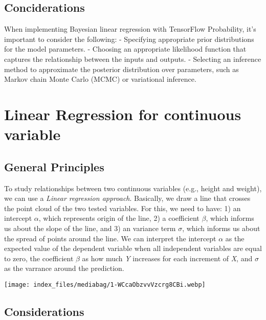 \documentclass[
  letterpaper,
  DIV=11,
  numbers=noendperiod]{scrreprt}
\begin{document}
\section{Conciderations}\label{conciderations}

When implementing Bayesian linear regression with TensorFlow
Probability, it's important to consider the following: - Specifying
appropriate prior distributions for the model parameters. - Choosing an
appropriate likelihood function that captures the relationship between
the inputs and outputs. - Selecting an inference method to approximate
the posterior distribution over parameters, such as Markov chain Monte
Carlo (MCMC) or variational inference.


\chapter{Linear Regression for continuous
variable}\label{linear-regression-for-continuous-variable}

\section{General Principles}\label{general-principles}

To study relationships between two continuous variables (e.g., height
and weight), we can use a \emph{Linear regression approach}. Basically,
we draw a line that crosses the point cloud of the two tested variables.
For this, we need to have: 1) an intercept \(\alpha\), which represents
origin of the line, 2) a coefficient \(\beta\), which informs us about
the slope of the line, and 3) an variance term \(\sigma\), which informs
us about the spread of points around the line. We can interpret the
intercept \(\alpha\) as the expected value of the dependent variable
when all independent variables are equal to zero, the coefficient
\(\beta\) as how much \emph{Y} increases for each increment of \emph{X},
and \(\sigma\) as the varrance around the prediction.

\texttt{[image: index\_files/mediabag/1-WCcaObzvvVzcrg8CBi.webp]}

\section{Considerations}\label{considerations}
\end{document}
